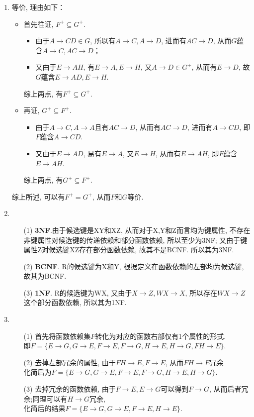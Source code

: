 \documentclass[10pt, a4paper]{article}
\begin{document}
	\begin{enumerate}
		\item 
		等价, 理由如下：
		\begin{itemize}
			\item 首先往证, $F^+ \subseteq G^+$.
			\begin{itemize}
				\item 由于$A \to CD \in G$, 所以有$A\to C,  A\to D$, 进而有$AC \to D$, 从而$G$蕴含$A\to C,  AC\to D$；
				\item 又由于$E\to AH$, 有$E\to A,  E\to H$, 又$A\to D \in G^+$, 从而有$E\to D$, 故$G$蕴含$E\to AD,  E\to H$.
			\end{itemize}
			综上两点, 有$F^+ \subseteq G^+$.
			\item 再证, $G^+ \subseteq F^+$.
			\begin{itemize}
				\item 由于$A\to C,  A\to A$且有$AC\to D$, 从而有$AC\to D$, 进而有$A\to CD$, 即$F$蕴含$A\to CD$.
				\item 又由于$E\to AD$, 易有$E\to A$, 又$E\to H$, 从而有$E\to AH$, 即$F$蕴含$E\to AH$.
			\end{itemize}
			综上两点, 有$G^+ \subseteq F^+$.
		\end{itemize}
		综上所述, 可以有$F^+ = G^+$, 从而$F$和$G$等价.
		\item \begin{enumerate}
			\item[(1)] \textbf{3NF}.由于候选键是XY和XZ, 从而对于X,Y和Z而言均为键属性, 不存在非键属性对候选键的传递依赖和部分函数依赖, 所以至少为3NF; 又由于键属性Z对候选键XZ存在部分函数依赖, 故其不是BCNF. 所以其为3NF.
			\item[(2)] \textbf{BCNF}. R的候选键为X和Y, 根据定义在函数依赖的左部均为候选键, 故其为BCNF.
			\item[(3)] \textbf{1NF}. R的候选键为WX, 又由于$X\to Z, WX\to X$, 所以存在$WX\to Z$这个部分函数依赖, 所以其为1NF. 
		\end{enumerate} 
		\item \begin{enumerate}
			\item[(1)] 首先将函数依赖集$F$转化为对应的函数右部仅有1个属性的形式.\\ 即$F=\{E\to G, G\to E, F\to E, F\to G, H\to E, H\to G, FH\to E\}$.
			\item[(2)] 去掉左部冗余的属性, 由于$FH\to E, F\to E$, 从而$FH\to E$冗余\\ 化简后为$F=\{E\to G, G\to E, F\to E, F\to G, H\to E, H\to G\}$.
			\item[(3)] 去掉冗余的函数依赖, 由于$F\to E, E\to G$可以得到$F\to G$, 从而后者冗余;同理可以有$H\to G$冗余,\\化简后的结果$F=\{E\to G, G\to E, F\to E, H\to E\}$. 

\end{enumerate}
\end{enumerate}
\end{document}
